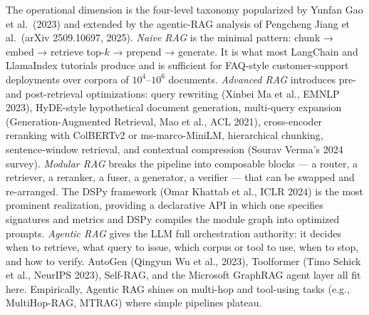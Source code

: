 The operational dimension is the four-level taxonomy popularized by Yunfan Gao et al.~(2023) and extended by the agentic-RAG analysis of Pengcheng Jiang et al.~(arXiv 2509.10697, 2025). \emph{Naive RAG} is the minimal pattern: chunk → embed → retrieve top-\(k\) → prepend → generate. It is what most LangChain and LlamaIndex tutorials produce and is sufficient for FAQ-style customer-support deployments over corpora of \(10^4\)--\(10^6\) documents. \emph{Advanced RAG} introduces pre- and post-retrieval optimizations: query rewriting (Xinbei Ma et al., EMNLP 2023), HyDE-style hypothetical document generation, multi-query expansion (Generation-Augmented Retrieval, Mao et al., ACL 2021), cross-encoder reranking with ColBERTv2 or ms-marco-MiniLM, hierarchical chunking, sentence-window retrieval, and contextual compression (Sourav Verma's 2024 survey). \emph{Modular RAG} breaks the pipeline into composable blocks --- a router, a retriever, a reranker, a fuser, a generator, a verifier --- that can be swapped and re-arranged. The DSPy framework (Omar Khattab et al., ICLR 2024) is the most prominent realization, providing a declarative API in which one specifies signatures and metrics and DSPy compiles the module graph into optimized prompts. \emph{Agentic RAG} gives the LLM full orchestration authority: it decides when to retrieve, what query to issue, which corpus or tool to use, when to stop, and how to verify. AutoGen (Qingyun Wu et al., 2023), Toolformer (Timo Schick et al., NeurIPS 2023), Self-RAG, and the Microsoft GraphRAG agent layer all fit here. Empirically, Agentic RAG shines on multi-hop and tool-using tasks (e.g., MultiHop-RAG, MTRAG) where simple pipelines plateau.

